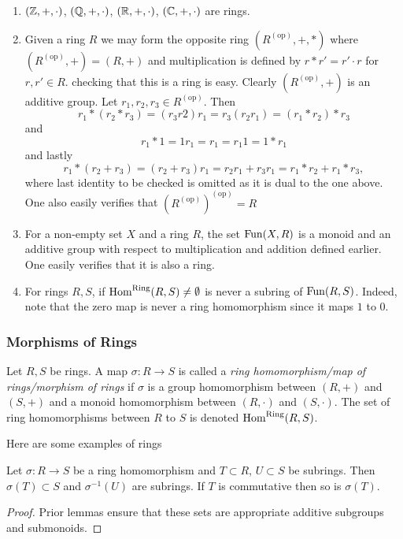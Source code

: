 \begin{example}
    \begin{enumerate}
        \item $(\mathbb{Z},+,\cdot)$, $(\mathbb{Q},+,\cdot)$, $(\mathbb{R},+,\cdot)$, $(\mathbb{C},+,\cdot)$ are rings.
        \item Given a ring $R$ we may form the opposite ring $(R^{(\text{op})},+,\ast)$ where $(R^{(\text{op})},+)=(R,+)$ and multiplication is defined by $r\ast r' = r' \cdot r$ for $r,r'\in R$. checking that this is a ring is easy. Clearly $(R^{(\text{op})},+)$ is an additive group. Let $r_1,r_2,r_3\in R^{(\text{op})}$. Then 
        $$r_1\ast (r_2\ast r_3) = (r_3r2)r_1 = r_3(r_2r_1) = (r_1\ast r_2)\ast r_3$$
        and 
        $$r_1 \ast 1= 1 r_1 = r_1= r_1 1= 1\ast r_1$$
        and lastly 
        $$r_1\ast(r_2+r_3)= (r_2+r_3)r_1 = r_2r_1+r_3r_1 = r_1\ast r_2+r_1\ast r_3,$$
        where last identity to be checked is omitted as it is dual to the one above.
        One also easily verifies that $\left(R^{(\text{op})}\right)^{(\text{op})} = R$
        \item For a non-empty set $X$ and a ring $R$, the set $\mathrm{Fun}(X,R)$ is a monoid and an additive group with respect to multiplication and addition defined earlier. One easily verifies that it is also a ring.
        \item For rings $R,S$, if $\mathrm{Hom}^\text{Ring}(R,S)\neq \emptyset$ is never a subring of $\mathrm{Fun}(R,S)$. Indeed, note that the zero map is never a ring homomorphism since it maps $1$ to $0$.  
    \end{enumerate}
\end{example}
\subsubsection{Morphisms of Rings}
\begin{definition}
    Let $R,S$ be rings. A map $\sigma : R \rightarrow S$ is called a \textit{ring homomorphism/map of rings/morphism of rings} if $\sigma$ is a group homomorphism between $(R,+)$ and $(S,+)$ and a monoid homomorphism between $(R,\cdot)$ and $(S,\cdot)$. The set of ring homomorphisms between $R$ to $S$ is denoted $\mathrm{Hom}^\text{Ring}(R,S)$.
\end{definition}
Here are some examples of rings 
\begin{lemma}
    Let $\sigma : R\rightarrow S$ be a ring homomorphism and $T\subset R$, $U\subset S$ be subrings. Then $\sigma(T)\subset S$ and $\sigma^{-1}(U)$ are subrings. If $T$ is commutative then so is $\sigma(T)$.
\end{lemma}
\begin{proof}
    Prior lemmas ensure that these sets are appropriate additive subgroups and submonoids.
\end{proof}
